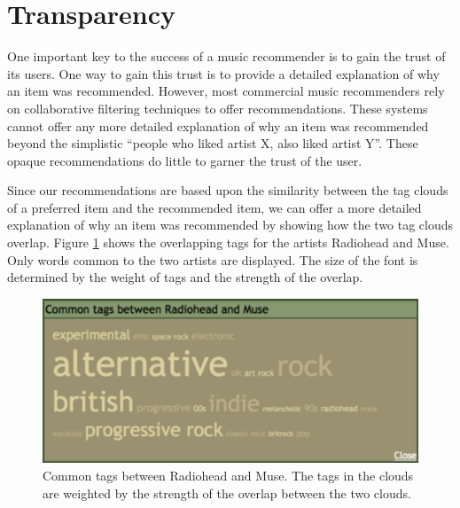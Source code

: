\documentclass{article}
\begin{document}
\section{Transparency}
One important key to the success  of a music recommender is to gain the
trust of its users.  One way to gain this trust is to provide
a detailed explanation of why an item was recommended. However,
most commercial music recommenders rely on collaborative filtering
techniques to offer recommendations.  These systems cannot offer
any more detailed explanation of why an item was recommended beyond
the simplistic ``people who liked artist X, also liked artist Y''.
These opaque recommendations do little to garner the  trust of the user.

Since our recommendations are based upon the similarity between  the tag clouds
of a preferred item and the recommended item, we can
offer a more detailed explanation of why an item was recommended
by showing how the two tag clouds overlap. Figure \ref{fig:commontags} shows
the overlapping tags for the artists Radiohead and Muse.
Only words common to the two artists are displayed. The size of the
font is determined by the weight of tags and the strength of the
overlap.

\begin{figure}[ht]
\begin{center}
\includegraphics[width=1.0\columnwidth]{radiohead-muse-commontags}
\end{center}
\caption{Common tags between Radiohead and Muse. 
The tags in the 
clouds are weighted by the strength of the overlap between the two clouds.}
\label{fig:commontags}
\end{figure}
\end{document}
